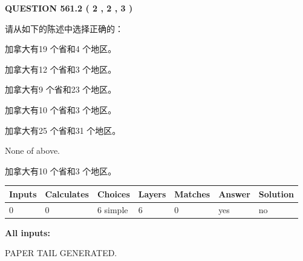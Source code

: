 \documentclass{ctexart}
\begin{document}
   
  
\vspace{0.2in}
  
{\textbf{\Large{QUESTION
561.2 
 ( 2 , 2 , 3 )
}}}
  
  
请从如下的陈述中选择正确的：
 
 
加拿大有19 个省和4 个地区。
 
 
加拿大有12 个省和3 个地区。
 
 
加拿大有9 个省和23 个地区。
 
 
加拿大有10 个省和3 个地区。
 
 
加拿大有25 个省和31 个地区。
 
 
 None of above.
 
 
\noindent{}
 
 
加拿大有10 个省和3 个地区。
 
 
\noindent{}
 
 
   
   
   
   
\noindent\begin{tabular}{|l|l|l|l|l|l|l|}
 \hline
Inputs & Calculates & Choices & Layers & Matches & Answer & Solution \\ \hline
 0  & 
 0  & 
 6
  simple  
  & 
 6  & 
 0  & 
  yes & 
  no 
  \\ \hline
 \end{tabular}
   
   
   
   
\noindent{}
   
   
   
   
\noindent\vspace{0.1in}\hspace{-0.08in} {\textbf{\Large{All inputs: }}}
   
   
   
   
   
   
 \vspace{0.2in}
 
   
   
\vspace{2.0in} PAPER TAIL GENERATED.
   
\end{document}
